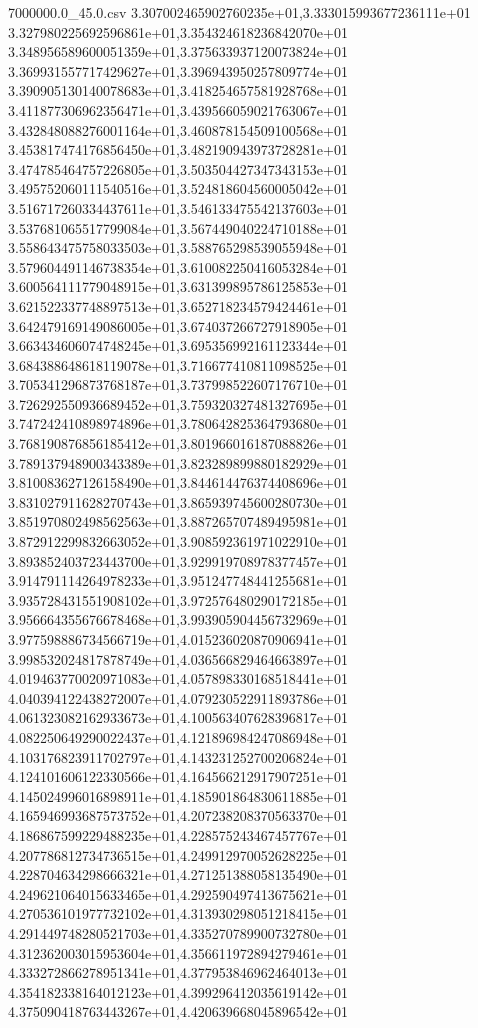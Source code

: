 \begin{filecontents*}{7000000.0_45.0.csv}
3.307002465902760235e+01,3.333015993677236111e+01
3.327980225692596861e+01,3.354324618236842070e+01
3.348956589600051359e+01,3.375633937120073824e+01
3.369931557717429627e+01,3.396943950257809774e+01
3.390905130140078683e+01,3.418254657581928768e+01
3.411877306962356471e+01,3.439566059021763067e+01
3.432848088276001164e+01,3.460878154509100568e+01
3.453817474176856450e+01,3.482190943973728281e+01
3.474785464757226805e+01,3.503504427347343153e+01
3.495752060111540516e+01,3.524818604560005042e+01
3.516717260334437611e+01,3.546133475542137603e+01
3.537681065517799084e+01,3.567449040224710188e+01
3.558643475758033503e+01,3.588765298539055948e+01
3.579604491146738354e+01,3.610082250416053284e+01
3.600564111779048915e+01,3.631399895786125853e+01
3.621522337748897513e+01,3.652718234579424461e+01
3.642479169149086005e+01,3.674037266727918905e+01
3.663434606074748245e+01,3.695356992161123344e+01
3.684388648618119078e+01,3.716677410811098525e+01
3.705341296873768187e+01,3.737998522607176710e+01
3.726292550936689452e+01,3.759320327481327695e+01
3.747242410898974896e+01,3.780642825364793680e+01
3.768190876856185412e+01,3.801966016187088826e+01
3.789137948900343389e+01,3.823289899880182929e+01
3.810083627126158490e+01,3.844614476374408696e+01
3.831027911628270743e+01,3.865939745600280730e+01
3.851970802498562563e+01,3.887265707489495981e+01
3.872912299832663052e+01,3.908592361971022910e+01
3.893852403723443700e+01,3.929919708978377457e+01
3.914791114264978233e+01,3.951247748441255681e+01
3.935728431551908102e+01,3.972576480290172185e+01
3.956664355676678468e+01,3.993905904456732969e+01
3.977598886734566719e+01,4.015236020870906941e+01
3.998532024817878749e+01,4.036566829464663897e+01
4.019463770020971083e+01,4.057898330168518441e+01
4.040394122438272007e+01,4.079230522911893786e+01
4.061323082162933673e+01,4.100563407628396817e+01
4.082250649290022437e+01,4.121896984247086948e+01
4.103176823911702797e+01,4.143231252700206824e+01
4.124101606122330566e+01,4.164566212917907251e+01
4.145024996016898911e+01,4.185901864830611885e+01
4.165946993687573752e+01,4.207238208370563370e+01
4.186867599229488235e+01,4.228575243467457767e+01
4.207786812734736515e+01,4.249912970052628225e+01
4.228704634298666321e+01,4.271251388058135490e+01
4.249621064015633465e+01,4.292590497413675621e+01
4.270536101977732102e+01,4.313930298051218415e+01
4.291449748280521703e+01,4.335270789900732780e+01
4.312362003015953604e+01,4.356611972894279461e+01
4.333272866278951341e+01,4.377953846962464013e+01
4.354182338164012123e+01,4.399296412035619142e+01
4.375090418763443267e+01,4.420639668045896542e+01

\end{filecontents*}
